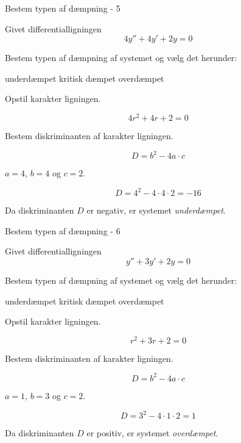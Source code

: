 \documentclass{article}
\begin{document}
\begin{exercise}{Bestem typen af dæmpning - 5}

Givet differentialligningen
\[
4y'' + 4y' + 2y = 0
\]

Bestem typen af dæmpning af systemet og vælg det herunder:
\begin{multichoice}
\itemtrue underdæmpet
\itemfalse kritisk dæmpet
\itemfalse overdæmpet
\end{multichoice}


\hint
Opstil karakter ligningen.

\hint
\[
4r^2 + 4r + 2 = 0
\]

\hint
Bestem diskriminanten af karakter ligningen.

\hint
\[
D = b^2 - 4 a \cdot c
\]

\hint
$a = 4$, $b = 4$ og $c = 2$.

\hint
\[
D = 4^2 - 4 \cdot 4 \cdot 2 = -16
\]

\hint
Da diskriminanten $D$ er negativ, er systemet \emph{underdæmpet}.

\end{exercise}

\newpage

\begin{exercise}{Bestem typen af dæmpning - 6}

Givet differentialligningen
\[
y'' + 3y' + 2y = 0
\]

Bestem typen af dæmpning af systemet og vælg det herunder:
\begin{multichoice}
\itemfalse underdæmpet
\itemfalse kritisk dæmpet
\itemtrue overdæmpet
\end{multichoice}


\hint
Opstil karakter ligningen.

\hint
\[
r^2 + 3r + 2 = 0
\]

\hint
Bestem diskriminanten af karakter ligningen.

\hint
\[
D = b^2 - 4 a \cdot c
\]

\hint
$a = 1$, $b = 3$ og $c = 2$.

\hint
\[
D = 3^2 - 4 \cdot 1 \cdot 2 = 1
\]

\hint
Da diskriminanten $D$ er positiv, er systemet \emph{overdæmpet}.

\end{exercise}
\end{document}
